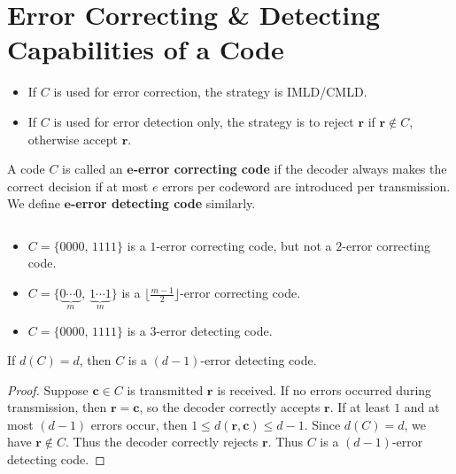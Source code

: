 
\section{Error Correcting \& Detecting Capabilities of a Code}
\begin{itemize}
    \item If $ C $ is used for error correction, the strategy is IMLD/CMLD.
    \item If $ C $ is used for error detection only, the strategy is
          to reject $ \bm{r} $ if $ \bm{r}\notin C $, otherwise accept $ \bm{r} $.
\end{itemize}
\begin{defbox}
    \begin{definition}
        A code $ C $ is called an \textbf{$\bm{e}$-error correcting code}
        if the decoder always makes the correct decision if
        at most $ e $ errors per codeword are introduced per transmission.
        We define \textbf{$\bm{e}$-error detecting code} similarly.
    \end{definition} \end{defbox}

\begin{exbox}
    \begin{example}$\;$
        \begin{itemize}
            \item $ C=\{0000,\,1111\} $ is a $ 1 $-error correcting code, but not a
                  $ 2 $-error correcting code.
            \item $ C=\{\underbrace{0\cdots 0}_{m},\,\underbrace{1\cdots 1}_{m}\} $
                  is a $ \lfloor \frac{m-1}{2} \rfloor $-error correcting code.
            \item $ C=\{0000,\,1111\} $ is a $ 3 $-error detecting code.
        \end{itemize}
    \end{example}
\end{exbox}

\begin{thmbox}
    \begin{theorem}
        If $ d(C)=d $, then $ C $ is a $ (d-1) $-error detecting code.
    \end{theorem} \end{thmbox}

\begin{proof}
    Suppose $ \bm{c}\in C $ is transmitted $ \bm{r} $ is received. If no
    errors occurred during transmission, then $ \bm{r}=\bm{c} $,
    so the decoder correctly accepts $ \bm{r} $. If at least $ 1 $
    and at most $ (d-1) $ errors occur, then
    $ 1\leqslant d(\bm{r},\bm{c})\leqslant d-1 $. Since $ d(C)=d $,
    we have $ \bm{r}\notin C $. Thus the decoder correctly rejects
    $ \bm{r} $. Thus $ C $ is a $ (d-1) $-error detecting code.
\end{proof}

